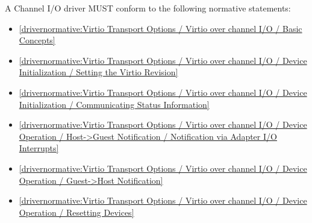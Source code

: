 \label{sec:Conformance / Driver Conformance / Channel I/O Driver Conformance}

A Channel I/O driver MUST conform to the following normative statements:

\begin{itemize}
\item \ref{drivernormative:Virtio Transport Options / Virtio over channel I/O / Basic Concepts}
\item \ref{drivernormative:Virtio Transport Options / Virtio over channel I/O / Device Initialization / Setting the Virtio Revision}
\item \ref{drivernormative:Virtio Transport Options / Virtio over channel I/O / Device Initialization / Communicating Status Information}
\item \ref{drivernormative:Virtio Transport Options / Virtio over channel I/O / Device Operation / Host->Guest Notification / Notification via Adapter I/O Interrupts}
\item \ref{drivernormative:Virtio Transport Options / Virtio over channel I/O / Device Operation / Guest->Host Notification}
\item \ref{drivernormative:Virtio Transport Options / Virtio over channel I/O / Device Operation / Resetting Devices}
\end{itemize}






















